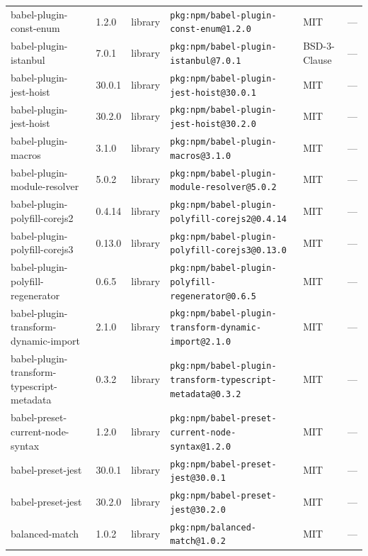 \documentclass[11pt,a4paper]{article}
\begin{document}
\begin{longtable}{|p{4cm}|p{2cm}|p{1.6cm}|p{5cm}|p{1.5cm}|p{3.5cm}|}
\raggedright babel-plugin-const-enum & 1.2.0 & library & \small\texttt{pkg:npm/babel-plugin-const-enum@1.2.0} & MIT & \small — \\
\raggedright babel-plugin-istanbul & 7.0.1 & library & \small\texttt{pkg:npm/babel-plugin-istanbul@7.0.1} & BSD-3-Clause & \small — \\
\raggedright babel-plugin-jest-hoist & 30.0.1 & library & \small\texttt{pkg:npm/babel-plugin-jest-hoist@30.0.1} & MIT & \small — \\
\raggedright babel-plugin-jest-hoist & 30.2.0 & library & \small\texttt{pkg:npm/babel-plugin-jest-hoist@30.2.0} & MIT & \small — \\
\raggedright babel-plugin-macros & 3.1.0 & library & \small\texttt{pkg:npm/babel-plugin-macros@3.1.0} & MIT & \small — \\
\raggedright babel-plugin-module-resolver & 5.0.2 & library & \small\texttt{pkg:npm/babel-plugin-module-resolver@5.0.2} & MIT & \small — \\
\raggedright babel-plugin-polyfill-corejs2 & 0.4.14 & library & \small\texttt{pkg:npm/babel-plugin-polyfill-corejs2@0.4.14} & MIT & \small — \\
\raggedright babel-plugin-polyfill-corejs3 & 0.13.0 & library & \small\texttt{pkg:npm/babel-plugin-polyfill-corejs3@0.13.0} & MIT & \small — \\
\raggedright babel-plugin-polyfill-regenerator & 0.6.5 & library & \small\texttt{pkg:npm/babel-plugin-polyfill-regenerator@0.6.5} & MIT & \small — \\
\raggedright babel-plugin-transform-dynamic-import & 2.1.0 & library & \small\texttt{pkg:npm/babel-plugin-transform-dynamic-import@2.1.0} & MIT & \small — \\
\raggedright babel-plugin-transform-typescript-metadata & 0.3.2 & library & \small\texttt{pkg:npm/babel-plugin-transform-typescript-metadata@0.3.2} & MIT & \small — \\
\raggedright babel-preset-current-node-syntax & 1.2.0 & library & \small\texttt{pkg:npm/babel-preset-current-node-syntax@1.2.0} & MIT & \small — \\
\raggedright babel-preset-jest & 30.0.1 & library & \small\texttt{pkg:npm/babel-preset-jest@30.0.1} & MIT & \small — \\
\raggedright babel-preset-jest & 30.2.0 & library & \small\texttt{pkg:npm/babel-preset-jest@30.2.0} & MIT & \small — \\
\raggedright balanced-match & 1.0.2 & library & \small\texttt{pkg:npm/balanced-match@1.0.2} & MIT & \small — \\

\end{longtable}
\end{document}
